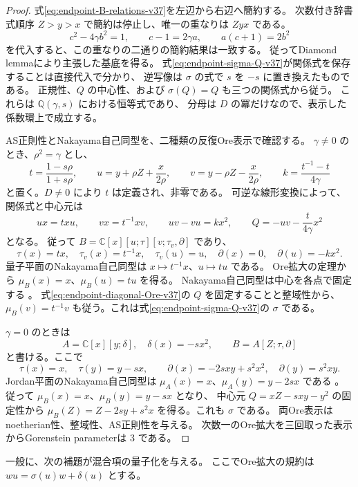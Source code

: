 \begin{proof}
式\eqref{eq:endpoint-B-relations-v37}を左辺から右辺へ簡約する。
次数付き辞書式順序 $Z>y>x$ で簡約は停止し、唯一の重なりは $Zyx$ である。
\[
 c^2-4\gamma b^2=1,\qquad
 c-1=2\gamma a,\qquad a(c+1)=2b^2
\]
を代入すると、この重なりの二通りの簡約結果は一致する。
従ってDiamond lemmaにより主張した基底を得る。
式\eqref{eq:endpoint-sigma-Q-v37}が関係式を保存することは直接代入で分かり、
逆写像は $\sigma$ の式で $s$ を $-s$ に置き換えたものである。
正規性、$Q$ の中心性、および $\sigma(Q)=Q$ も三つの関係式から従う。
これらは $\mathbb Q(\gamma,s)$ における恒等式であり、
分母は $D$ の冪だけなので、表示した係数環上で成立する。

AS正則性とNakayama自己同型を、二種類の反復Ore表示で確認する。
$\gamma\ne0$ のとき、$\rho^2=\gamma$ とし、
\[
 t=\frac{1-s\rho}{1+s\rho},\qquad
 u=y+\rho Z+\frac{x}{2\rho},\qquad
 v=y-\rho Z-\frac{x}{2\rho},\qquad
 k=\frac{t^{-1}-t}{4\gamma}
\]
と置く。$D\ne0$ により $t$ は定義され、非零である。
可逆な線形変換によって、関係式と中心元は
\begin{equation}
\label{eq:endpoint-diagonal-Ore-v37}
 ux=t xu,\qquad vx=t^{-1}xv,\qquad
 uv-vu=kx^2,\qquad Q=-uv-\frac{t}{4\gamma}x^2
\end{equation}
となる。
従って $B=\mathbb C[x][u;\tau][v;\tau_v,\partial]$ であり、
\[
 \tau(x)=tx,\quad
 \tau_v(x)=t^{-1}x,\quad \tau_v(u)=u,\quad
 \partial(x)=0,\quad\partial(u)=-kx^2.
\]
量子平面のNakayama自己同型は $x\mapsto t^{-1}x$、$u\mapsto tu$ である。
Ore拡大の定理\cite[Theorem~3.3]{LWWEndpoint37}から
$\mu_B(x)=x$、$\mu_B(u)=tu$ を得る。
Nakayama自己同型は中心を各点で固定する
\cite[Lemma~4.5]{ReyesRogalski2022}。
式\eqref{eq:endpoint-diagonal-Ore-v37}の $Q$ を固定することと整域性から、
$\mu_B(v)=t^{-1}v$ も従う。これは式\eqref{eq:endpoint-sigma-Q-v37}の $\sigma$ である。

$\gamma=0$ のときは
\[
 A=\mathbb C[x][y;\delta],\quad\delta(x)=-s x^2,\qquad
 B=A[Z;\tau,\partial]
\]
と書ける。ここで
\[
 \tau(x)=x,\quad\tau(y)=y-sx,\qquad
 \partial(x)=-2sxy+s^2x^2,\quad\partial(y)=s^2xy.
\]
Jordan平面のNakayama自己同型は
$\mu_A(x)=x$、$\mu_A(y)=y-2sx$ である
\cite[\S4.2]{LWWEndpoint37}。
従って $\mu_B(x)=x$、$\mu_B(y)=y-sx$ となり、
中心元 $Q=xZ-sxy-y^2$ の固定性から
$\mu_B(Z)=Z-2sy+s^2x$ を得る。これも $\sigma$ である。
両Ore表示はnoetherian性、整域性、AS正則性を与える。
次数一のOre拡大を三回取った表示からGorenstein parameterは $3$ である。
\end{proof}

一般に、次の補題が混合項の量子化を与える。
ここでOre拡大の規約は $wu=\sigma(u)w+\delta(u)$ とする。

